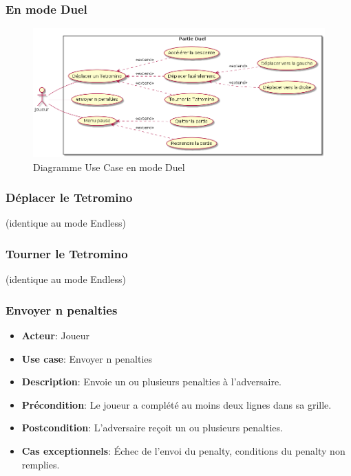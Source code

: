 \documentclass{article}
\begin{document}
\subsubsection{En mode Duel}

\begin{figure}[!h]
    \centering
    \includegraphics[width=1\textwidth]{../res/uml/usecase/DualUseCase.png}
    \caption{Diagramme Use Case en mode Duel}
    \label{fig:Duel}
\end{figure}

\subsubsection*{Déplacer le Tetromino} (identique au mode Endless)

\subsubsection*{Tourner le Tetromino} (identique au mode Endless)

\subsubsection*{Envoyer n penalties}
\begin{itemize}
    \item \textbf{Acteur}: Joueur
    \item \textbf{Use case}: Envoyer n penalties
    \item \textbf{Description}: Envoie un ou plusieurs penalties à l'adversaire.
    \item \textbf{Précondition}: Le joueur a complété au moins deux lignes dans sa grille.
    \item \textbf{Postcondition}: L'adversaire reçoit un ou plusieurs penalties.
    \item \textbf{Cas exceptionnels}: Échec de l’envoi du penalty, conditions du penalty non remplies.
\end{itemize}
\end{document}
